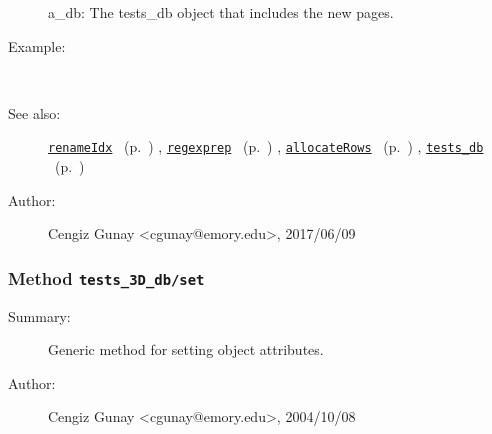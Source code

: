 \begin{description}
   a\_db: The tests\_db object that includes the new pages.
%
\item[Example:]~
%
\item[See also:]%
\hyperlink{ref_renameIdx}{\texttt{renameIdx}}%
\ (p.~\pageref{ref_renameIdx})%
%
, \hyperlink{ref_regexprep}{\texttt{regexprep}}%
\ (p.~\pageref{ref_regexprep})%
%
, \hyperlink{ref_allocateRows}{\texttt{allocateRows}}%
\ (p.~\pageref{ref_allocateRows})%
%
, \hyperlink{ref_tests_db}{\texttt{tests\_db}}%
\ (p.~\pageref{ref_tests_db})%
%
%
\item[Author:]%
Cengiz Gunay <cgunay@emory.edu>, 2017/06/09
%
\end{description}
\methodline%
\subsubsection[Method \texttt{set}]{Method \texttt{tests\_3D\_db/set}}%
%
\label{ref_tests_3D_db__set}%
\hypertarget{ref_tests_3D_db__set}{}%
\begin{description}
\item[Summary:]Generic method for setting object attributes.
%
%
%
%
%
%
%
\item[Author:]%
Cengiz Gunay <cgunay@emory.edu>, 2004/10/08
%
\end{description}
\methodline%
